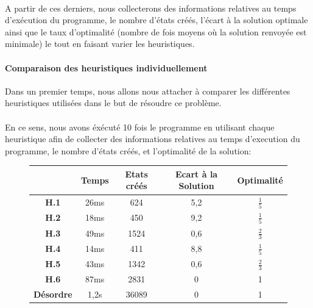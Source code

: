 \documentclass[10pt,a4paper]{report}
\begin{document}
\paragraph{}{A partir de ces derniers, nous collecterons des informations relatives au temps d'exécution du programme, le nombre d'états créés, l'écart à la solution optimale ainsi que le taux d'optimalité (nombre de fois moyens où la solution renvoyée est minimale) le tout en faisant varier les heuristiques.}

\paragraph{Comparaison des heuristiques individuellement}{Dans un premier temps, nous allons nous attacher à comparer les différentes heuristiques utilisées dans le but de résoudre ce problème.}
\paragraph{}{En ce sens, nous avons éxécuté 10 fois le programme en utilisant chaque heuristique afin de collecter des informations relatives au temps d'execution du programme, le nombre d'états créés, et l'optimalité de la solution:}
{\scriptsize{}
\renewcommand{\arraystretch}{1.3}
\vspace*{1cm}
\begin{figure}[h!]
\centering
\begin{tabular}{| c | c | c | c | c |} \hline
\textbf{ } & \textbf{Temps} & \textbf{Etats créés} & \textbf{Ecart à la Solution} & \textbf{Optimalité} \\ \hline
\textbf{H.1} & 26ms & 624 & 5,2 &  $\frac{1}{5}$ \\ \hline
\textbf{H.2} & 18ms & 450 & 9,2 & $\frac{1}{5}$ \\ \hline
\textbf{H.3} & 49ms & 1524 & 0,6 & $\frac{2}{3}$ \\ \hline
\textbf{H.4} & 14ms & 411 & 8,8 & $\frac{1}{5}$ \\ \hline
\textbf{H.5} & 43ms & 1342 & 0,6 & $\frac{2}{3}$ \\ \hline
\textbf{H.6} & 87ms & 2831 & 0 & 1 \\ \hline
\textbf{Désordre} & 1,2s & 36089 & 0 & 1 \\ \hline
\end{tabular}
\end{figure}
\vspace*{1cm}
}

\end{document}
